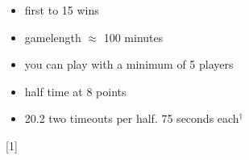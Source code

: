 \small{
    \begin{itemize}
        \item first to 15 wins
        \item gamelength $\approx$ 100 minutes
        \item you can play with a minimum of 5 players
        \item half time at 8 points
        \item 20.2 two timeouts per half. 75 seconds each$^\dagger$
    \end{itemize}
}


\begin{center}[1]\end{center}
